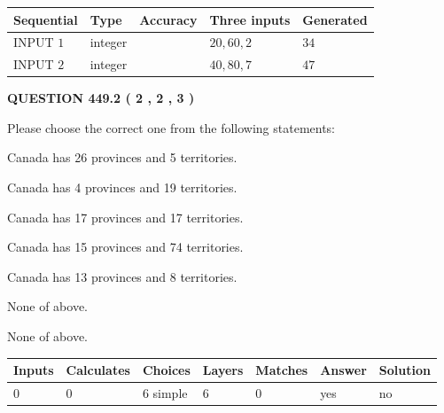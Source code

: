 \documentclass[12pt]{article}
\begin{document}
  
\noindent\begin{tabular}{|l|l|l|l|l|}
\hline
 Sequential & Type & Accuracy & Three inputs & Generated \\ 
\hline
 
 
  INPUT $  1 $ & integer &  & $
 20
 , 
 60
 , 
 2
 $ & $ 34 $ 
 \\  \hline  
 
 
  INPUT $  2 $ & integer &  & $
 40
 , 
 80
 , 
 7
 $ & $ 47 $ 
 \\  \hline  
 \end{tabular}
   
   
  
\vspace{0.2in}
  
{\textbf{\Large{QUESTION
449.2 
 ( 2 , 2 , 3 )
}}}
  
  
Please choose the correct one from the following statements:
 
 
Canada has  26 provinces and  5 territories.
 
 
Canada has   4 provinces and  19 territories.
 
 
Canada has  17 provinces and  17 territories.
 
 
Canada has  15 provinces and  74 territories.
 
 
Canada has  13 provinces and  8 territories.
 
 
 None of above.
 
 
\noindent{}
 
 
 None of above.
 
 
\noindent{}
 
 
   
   
   
   
\noindent\begin{tabular}{|l|l|l|l|l|l|l|}
 \hline
Inputs & Calculates & Choices & Layers & Matches & Answer & Solution \\ \hline
 0  & 
 0  & 
 6
  simple  
  & 
 6  & 
 0  & 
  yes & 
  no 
  \\ \hline
 \end{tabular}
   
\end{document}
